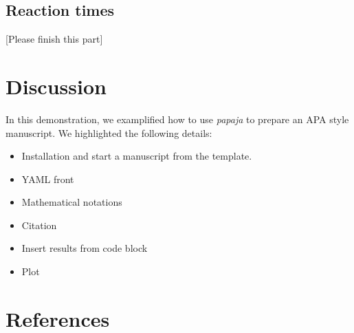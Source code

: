 \documentclass[
  man]{apa6}
\providecommand{\tightlist}{%
  \setlength{\itemsep}{0pt}\setlength{\parskip}{0pt}}
\begin{document}
\subsection{Reaction times}\label{reaction-times}

{[}Please finish this part{]}

\section{Discussion}\label{discussion}

In this demonstration, we examplified how to use \emph{papaja} to prepare an APA style manuscript. We highlighted the following details:

\begin{itemize}
\tightlist
\item
  Installation and start a manuscript from the template.
\item
  YAML front
\item
  Mathematical notations
\item
  Citation
\item
  Insert results from code block
\item
  Plot
\end{itemize}

\newpage

\section{References}\label{references}
\end{document}

